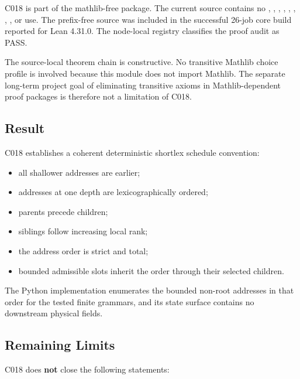 C018 is part of the mathlib-free \texttt{\protect{}} package. The
current source contains no \texttt{\protect{}}, \texttt{\protect{}},
\texttt{\protect{}}, \texttt{\protect{}}, \texttt{\protect{}},
\texttt{\protect{}}, \texttt{\protect{}}, \texttt{\protect{}}, or \texttt{\protect{}} use.
The prefix-free source was included in the successful 26-job core build
reported for Lean 4.31.0. The node-local registry classifies the proof
audit as PASS.

The source-local theorem chain is constructive. No transitive Mathlib
choice profile is involved because this module does not import Mathlib.
The separate long-term project goal of eliminating transitive axioms in
Mathlib-dependent proof packages is therefore not a limitation of C018.

\subsection{Result}\label{result-5}

C018 establishes a coherent deterministic shortlex schedule convention:

\begin{itemize}
\tightlist
\item
  all shallower addresses are earlier;
\item
  addresses at one depth are lexicographically ordered;
\item
  parents precede children;
\item
  siblings follow increasing local rank;
\item
  the address order is strict and total;
\item
  bounded admissible slots inherit the order through their selected
  children.
\end{itemize}

The Python implementation enumerates the bounded non-root addresses in
that order for the tested finite grammars, and its state surface
contains no downstream physical fields.

\subsection{Remaining Limits}\label{remaining-limits}

C018 does \textbf{not} close the following statements:


